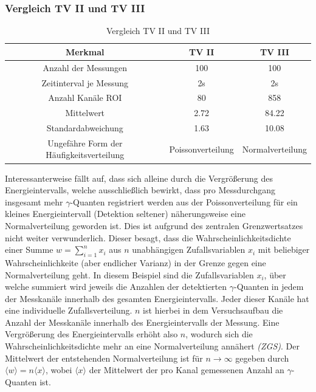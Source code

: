 \documentclass{report}
\begin{document}
\subsubsection{Vergleich TV II und TV III}
\begin{table}[H]
    \centering
    \caption{Vergleich TV II und TV III}
    \label{tab:vglTV2TV3}
    \begin{tabular}{| c || c c |}
        \hline
        Merkmal & TV II & TV III \\
        \hline
        Anzahl der Messungen & 100 & 100 \\
        Zeitinterval je Messung & 2s & 2s \\
        Anzahl Kanäle ROI & 80 & 858 \\
        Mittelwert & 2.72 & 84.22 \\
        Standardabweichung & 1.63 & 10.08 \\
        Ungefähre Form der Häufigkeitsverteilung & Poissonverteilung & Normalverteilung \\
        \hline
    \end{tabular}
\end{table}

Interessanterweise fällt auf, dass sich alleine durch die Vergrößerung des Energieintervalls, welche ausschließlich bewirkt, dass pro Messdurchgang insgesamt mehr 
$\gamma$-Quanten registriert werden aus der Poissonverteilung für ein kleines Energieintervall (Detektion seltener) näherungsweise eine Normalverteilung geworden ist. 
Dies ist aufgrund des zentralen Grenzwertsatzes nicht weiter verwunderlich. Dieser besagt, dass die Wahrscheinlichkeitsdichte einer Summe $w = \sum_{i=1}^{n} x_i$
aus $n$ unabhängigen Zufallsvariablen $x_i$ mit beliebiger Wahrscheinlichkeite (aber endlicher Varianz) in der Grenze gegen eine Normalverteilung geht. In diesem Beispiel sind die Zufallsvariablen $x_i$, über welche 
summiert wird jeweils die Anzahlen der detektierten $\gamma$-Quanten in jedem der Messkanäle innerhalb des gesamten Energieintervalls. Jeder dieser Kanäle hat eine individuelle Zufallsverteilung.
$n$ ist hierbei in dem Versuchsaufbau die Anzahl der Messkanäle innerhalb des Energieintervalls der Messung. Eine Vergrößerung des Energieintervalls erhöht 
also $n$, wodurch sich die Wahrscheinlichkeitsdichte mehr an eine Normalverteilung annähert \textit{(ZGS)}.
Der Mittelwert der entstehenden Normalverteilung ist für $n \rightarrow \infty$ gegeben durch $\langle w \rangle = n \langle x \rangle$, wobei $\langle x \rangle$ 
der Mittelwert der pro Kanal gemessenen Anzahl an $\gamma$-Quanten ist.
\end{document}
